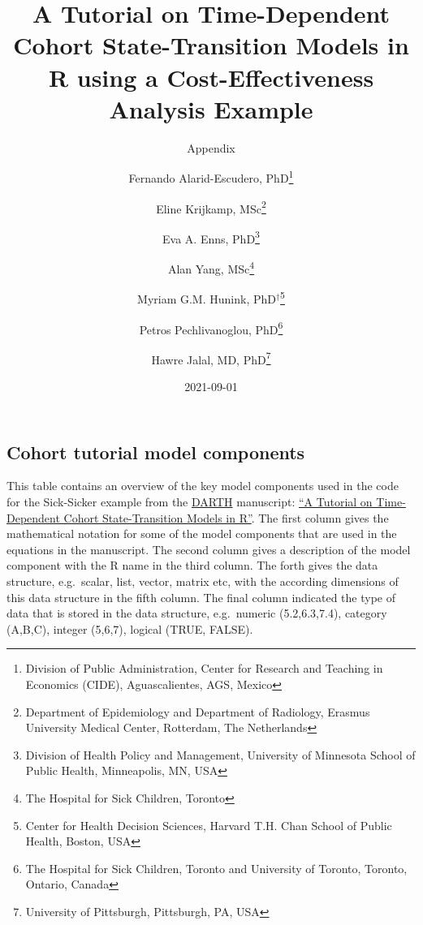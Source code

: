 \documentclass[
  landscape]{article}
\title{A Tutorial on Time-Dependent Cohort State-Transition Models in R
using a Cost-Effectiveness Analysis Example}
\subtitle{Appendix}
\author{Fernando Alarid-Escudero, PhD\footnote{Division of Public
  Administration, Center for Research and Teaching in Economics (CIDE),
  Aguascalientes, AGS, Mexico} \and Eline Krijkamp,
MSc\footnote{Department of Epidemiology and Department of Radiology,
  Erasmus University Medical Center, Rotterdam, The Netherlands} \and Eva
A. Enns, PhD\footnote{Division of Health Policy and Management,
  University of Minnesota School of Public Health, Minneapolis, MN, USA} \and Alan
Yang, MSc\footnote{The Hospital for Sick Children, Toronto} \and Myriam
G.M. Hunink, PhD\(^\dagger\)\footnote{Center for Health Decision
  Sciences, Harvard T.H. Chan School of Public Health, Boston, USA} \and Petros
Pechlivanoglou, PhD\footnote{The Hospital for Sick Children, Toronto and
  University of Toronto, Toronto, Ontario, Canada} \and Hawre Jalal, MD,
PhD\footnote{University of Pittsburgh, Pittsburgh, PA, USA}}
\date{2021-09-01}
\begin{document}
\maketitle

\hypertarget{cohort-tutorial-model-components}{%
\subsection{Cohort tutorial model
components}\label{cohort-tutorial-model-components}}

This table contains an overview of the key model components used in the
code for the Sick-Sicker example from the
\href{http://darthworkgroup.com/}{DARTH} manuscript:
\href{https://arxiv.org/abs/2108.13552}{``A Tutorial on Time-Dependent
Cohort State-Transition Models in R''}. The first column gives the
mathematical notation for some of the model components that are used in
the equations in the manuscript. The second column gives a description
of the model component with the R name in the third column. The forth
gives the data structure, e.g.~scalar, list, vector, matrix etc, with
the according dimensions of this data structure in the fifth column. The
final column indicated the type of data that is stored in the data
structure, e.g.~numeric (5.2,6.3,7.4), category (A,B,C), integer
(5,6,7), logical (TRUE, FALSE).
\end{document}
